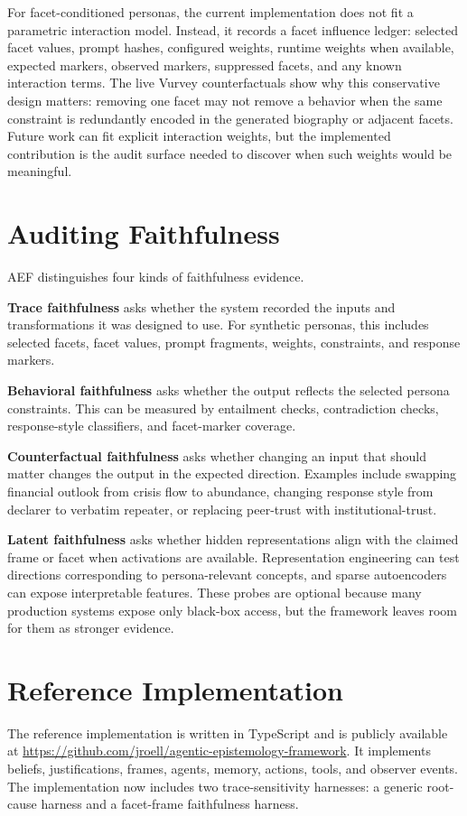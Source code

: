 \documentclass[10pt,a4paper]{article}
\newcommand{\method}{AEF}
\begin{document}
For facet-conditioned personas, the current implementation does not fit a parametric interaction model. Instead, it records a facet influence ledger: selected facet values, prompt hashes, configured weights, runtime weights when available, expected markers, observed markers, suppressed facets, and any known interaction terms. The live Vurvey counterfactuals show why this conservative design matters: removing one facet may not remove a behavior when the same constraint is redundantly encoded in the generated biography or adjacent facets. Future work can fit explicit interaction weights, but the implemented contribution is the audit surface needed to discover when such weights would be meaningful.

\section{Auditing Faithfulness}
\method{} distinguishes four kinds of faithfulness evidence.

\textbf{Trace faithfulness} asks whether the system recorded the inputs and transformations it was designed to use. For synthetic personas, this includes selected facets, facet values, prompt fragments, weights, constraints, and response markers.

\textbf{Behavioral faithfulness} asks whether the output reflects the selected persona constraints. This can be measured by entailment checks, contradiction checks, response-style classifiers, and facet-marker coverage.

\textbf{Counterfactual faithfulness} asks whether changing an input that should matter changes the output in the expected direction. Examples include swapping financial outlook from crisis flow to abundance, changing response style from declarer to verbatim repeater, or replacing peer-trust with institutional-trust.

\textbf{Latent faithfulness} asks whether hidden representations align with the claimed frame or facet when activations are available. Representation engineering can test directions corresponding to persona-relevant concepts, and sparse autoencoders can expose interpretable features. These probes are optional because many production systems expose only black-box access, but the framework leaves room for them as stronger evidence.

\section{Reference Implementation}
The reference implementation is written in TypeScript and is publicly available at \url{https://github.com/jroell/agentic-epistemology-framework}. It implements beliefs, justifications, frames, agents, memory, actions, tools, and observer events. The implementation now includes two trace-sensitivity harnesses: a generic root-cause harness and a facet-frame faithfulness harness.
\end{document}
